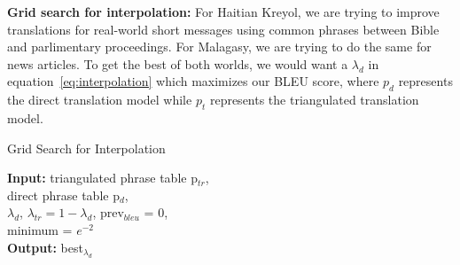 \documentclass[11pt]{article}
\begin{document}
\textbf{Grid search for interpolation:} For Haitian Kreyol, we are trying to improve translations for real-world short messages using common phrases between Bible and parlimentary proceedings. For Malagasy, we are trying to do the same for news articles. To get the best of both worlds, we would want a $\lambda_{d}$ in equation~\eqref{eq:interpolation} which maximizes our BLEU score, where $p_{d}$ represents the direct translation model while $p_{t}$ represents the triangulated translation model. 
		
	\begin{algorithm}
		\caption{Grid Search for Interpolation}
		\label{algo:condor}
		\textbf{Input:} triangulated phrase table p$_{tr}$, \\ direct phrase table p$_{d}$, \\
		$\lambda_{d}$, $\lambda_{tr} = 1 - \lambda_{d}$, prev$_{bleu}$ = 0, \\
		minimum = $e ^{-2}$ \\
		\textbf{Output:} best$_{\lambda_{d}}$


		\begin{algorithmic}[1]
			 \label{aline:condition}
			 \label{aline:inter}
			 \label{aline:search}
			\ENDWHILE
		\end{algorithmic}
	\end{algorithm}
\end{document}
